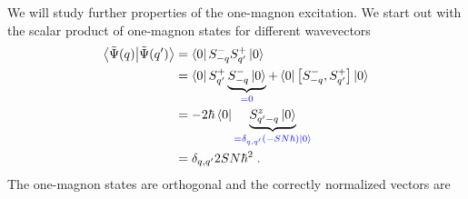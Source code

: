 We will study further properties of the one-magnon excitation. We start out with the scalar product of one-magnon states for different wavevectors
%
\begin{align*}
\braket{\tilde \Psi(q)}{\tilde \Psi(q')} &=
\bra{0} S_{-q}^{-} S_{q'}^{+}\ket{0}\\
&=\bra{0} S_{q'}^{+} \underbrace{
S_{-q}^{-}\ket{0}
}_{\color{blue} = 0}+\bra{0} \big[S_{-q}^{-}, S_{q'}^{+}\big]\ket{0}\\
&=-2\hbar \bra{0} \underbrace{
S_{q'-q}^{z}\ket{0}
}_{\color{blue} = \delta_{q,q'}(- S N \hbar) \ket{0}}\\
&=\delta_{q,q'} 2 S N  \hbar^{2}\;.
\end{align*}
%
The one-magnon states are orthogonal  and the correctly normalized vectors are
%
%

